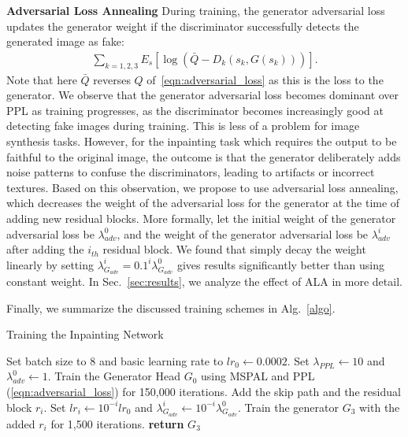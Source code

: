 \noindent\textbf{Adversarial Loss Annealing} During training, the generator adversarial loss updates the generator weight if the discriminator successfully detects the generated image as fake:
\begin{eqnarray}
\sum\limits_{k=1,2,3}E_s[\log (\bar{Q}-D_k(s_k,G(s_k)))].
\end{eqnarray}
Note that here $\bar{Q}$ reverses $Q$ of~\ref{eqn:adversarial_loss} as this is the loss to the generator. We observe that the generator adversarial loss becomes dominant over PPL as training progresses, as the discriminator becomes increasingly good at detecting fake images during training. This is less of a problem for image synthesis tasks. However, for the inpainting task which requires the output to be faithful to the original image, the outcome is that the generator deliberately adds noise patterns to confuse the discriminators, leading to artifacts or incorrect textures. Based on this observation, we propose to use adversarial loss annealing, which decreases the weight of the adversarial loss for the generator at the time of adding new residual blocks. More formally, let the initial weight of the generator adversarial loss be $\lambda^0_{adv}$, and the weight of the generator adversarial loss be $\lambda^i_{adv}$ after adding the $i_{th}$ residual block. We found that simply decay the weight linearly by setting $\lambda^i_{G_{adv}}=0.1^i\lambda^0_{G_{adv}}$ gives results significantly better than using constant weight. In Sec.~\ref{sec:results}, we analyze the effect of ALA in more detail.

Finally, we summarize the discussed training schemes in Alg.~\ref{algo}.
\begin{algorithm}
\caption{Training the Inpainting Network}\label{algo}
\begin{algorithmic}[1]
\State Set batch size to 8 and basic learning rate to $lr_0\gets 0.0002$.
\State Set $\lambda_{PPL}\gets 10$ and $\lambda^0_{{adv}}\gets 1$.
\State Train the Generator Head $G_0$ using MSPAL and PPL (\ref{eqn:adversarial_loss}) for 150,000 iterations.
\State Add the skip path and the residual block $r_i$.
\State Set $lr_i\gets 10^{-i} lr_0$ and $\lambda^i_{G_{adv}}\gets 10^{-i}\lambda^0_{G_{adv}}$.
\State Train the generator $G_3$ with the added $r_i$ for 1,500 iterations.
\EndFor
\State \textbf{return} $G_3$ 
\end{algorithmic}
\end{algorithm}
